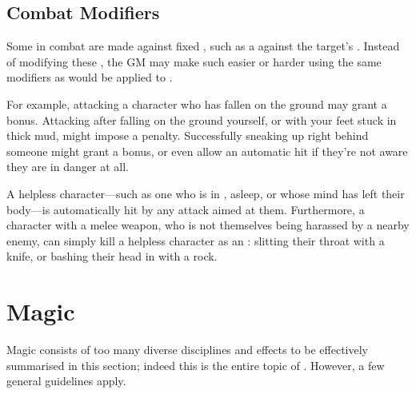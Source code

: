 

\subsection{Combat Modifiers}

Some {\tests} in combat are made against fixed {\tns}, such as a  {\test} against the target's .
Instead of modifying these {\tns}, the GM may make such {\tests} easier or harder using the same modifiers as would be applied to {\opposedtests}.

For example, attacking a character who has fallen on the ground may grant a  bonus.
Attacking after falling on the ground yourself, or with your feet stuck in thick mud, might impose a  penalty.
Successfully sneaking up right behind someone might grant a  bonus, or even allow an automatic hit if they're not aware they are in danger at all.

A helpless character---such as one who is in {\shock}, asleep, or whose mind has left their body---is automatically hit by any attack aimed at them.
Furthermore, a character with a melee weapon, who is not themselves being harassed by a nearby enemy, can simply kill a helpless character as an {\action}: slitting their throat with a knife, or bashing their head in with a rock.

\section{Magic}

Magic consists of too many diverse disciplines and effects to be effectively summarised in this section; indeed this is the entire topic of .
However, a few general guidelines apply.


